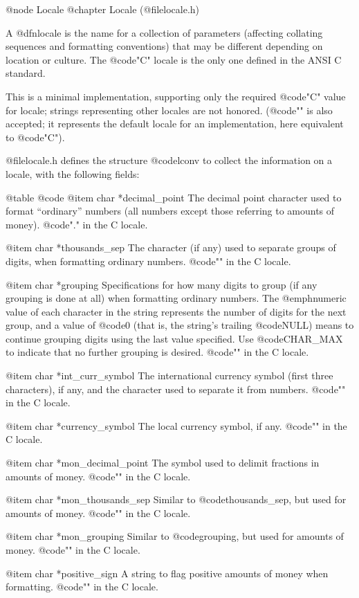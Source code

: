 @node Locale
@chapter Locale (@file{locale.h})

A @dfn{locale} is the name for a collection of parameters (affecting
collating sequences and formatting conventions) that may be different
depending on location or culture.  The @code{"C"} locale is the only
one defined in the ANSI C standard.

This is a minimal implementation, supporting only the required @code{"C"}
value for locale; strings representing other locales are not
honored.  (@code{""} is also accepted; it represents the default locale
for an implementation, here equivalent to @code{"C"}).


@file{locale.h} defines the structure @code{lconv} to collect the
information on a locale, with the following fields:

@table @code
@item char *decimal_point
The decimal point character used to format ``ordinary'' numbers (all
numbers except those referring to amounts of money).  @code{"."} in the
C locale. 

@item char *thousands_sep
The character (if any) used to separate groups of digits, when
formatting ordinary numbers.
@code{""} in the C locale.

@item char *grouping
Specifications for how many digits to group (if any grouping is done at
all) when formatting ordinary numbers.  The @emph{numeric value} of each
character in the string represents the number of digits for the next
group, and a value of @code{0} (that is, the string's trailing
@code{NULL}) means to continue grouping digits using the last value
specified.  Use @code{CHAR_MAX} to indicate that no further grouping is
desired.  @code{""} in the C locale. 

@item char *int_curr_symbol
The international currency symbol (first three characters), if any, and
the character used to separate it from numbers.
@code{""} in the C locale.

@item char *currency_symbol
The local currency symbol, if any.
@code{""} in the C locale.

@item char *mon_decimal_point
The symbol used to delimit fractions in amounts of money.
@code{""} in the C locale.

@item char *mon_thousands_sep
Similar to @code{thousands_sep}, but used for amounts of money.
@code{""} in the C locale.

@item char *mon_grouping
Similar to @code{grouping}, but used for amounts of money.
@code{""} in the C locale.

@item char *positive_sign
A string to flag positive amounts of money when formatting.
@code{""} in the C locale.

